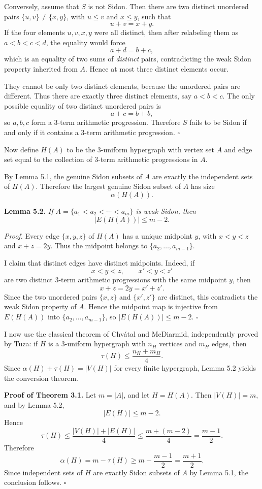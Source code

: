 Conversely, assume that $S$ is not Sidon. Then there are two distinct unordered pairs $\{u,v\}\neq\{x,y\}$, with $u\le v$ and $x\le y$, such that
\[
 u+v=x+y.
\]
If the four elements $u,v,x,y$ were all distinct, then after relabeling them as $a<b<c<d$, the equality would force
\[
 a+d=b+c,
\]
which is an equality of two sums of \emph{distinct} pairs, contradicting the weak Sidon property inherited from $A$. Hence at most three distinct elements occur.

They cannot be only two distinct elements, because the unordered pairs are different. Thus there are exactly three distinct elements, say $a<b<c$. The only possible equality of two distinct unordered pairs is
\[
 a+c=b+b,
\]
so $a,b,c$ form a 3-term arithmetic progression. Therefore $S$ fails to be Sidon if and only if it contains a 3-term arithmetic progression. \hfill$\square$

\medskip
Now define $H(A)$ to be the 3-uniform hypergraph with vertex set $A$ and edge set equal to the collection of 3-term arithmetic progressions in $A$.

By Lemma 5.1, the genuine Sidon subsets of $A$ are exactly the independent sets of $H(A)$. Therefore the largest genuine Sidon subset of $A$ has size
\[
\alpha(H(A)).
\]

\medskip
\noindent\textbf{Lemma 5.2.} \emph{If $A=\{a_1<a_2<\cdots<a_m\}$ is weak Sidon, then}
\[
|E(H(A))|\le m-2.
\]

\medskip
\noindent\emph{Proof.} Every edge $\{x,y,z\}$ of $H(A)$ has a unique midpoint $y$, with $x<y<z$ and $x+z=2y$. Thus the midpoint belongs to $\{a_2,\dots,a_{m-1}\}$.

I claim that distinct edges have distinct midpoints. Indeed, if
\[
 x<y<z, \qquad x'<y<z'
\]
are two distinct 3-term arithmetic progressions with the same midpoint $y$, then
\[
 x+z=2y=x'+z'.
\]
Since the two unordered pairs $\{x,z\}$ and $\{x',z'\}$ are distinct, this contradicts the weak Sidon property of $A$. Hence the midpoint map is injective from $E(H(A))$ into $\{a_2,\dots,a_{m-1}\}$, so $|E(H(A))|\le m-2$. \hfill$\square$

\medskip
I now use the classical theorem of Chv\'atal and McDiarmid, independently proved by Tuza: if $H$ is a 3-uniform hypergraph with $n_H$ vertices and $m_H$ edges, then
\[
\tau(H)\le \frac{n_H+m_H}{4}.
\]
Since $\alpha(H)+\tau(H)=|V(H)|$ for every finite hypergraph, Lemma 5.2 yields the conversion theorem.

\medskip
\noindent\textbf{Proof of Theorem 3.1.} Let $m=|A|$, and let $H=H(A)$. Then $|V(H)|=m$, and by Lemma 5.2,
\[
|E(H)|\le m-2.
\]
Hence
\[
\tau(H)\le \frac{|V(H)|+|E(H)|}{4}\le \frac{m+(m-2)}{4}=\frac{m-1}{2}.
\]
Therefore
\[
\alpha(H)=m-\tau(H)\ge m-\frac{m-1}{2}=\frac{m+1}{2}.
\]
Since independent sets of $H$ are exactly Sidon subsets of $A$ by Lemma 5.1, the conclusion follows. \hfill$\square$

